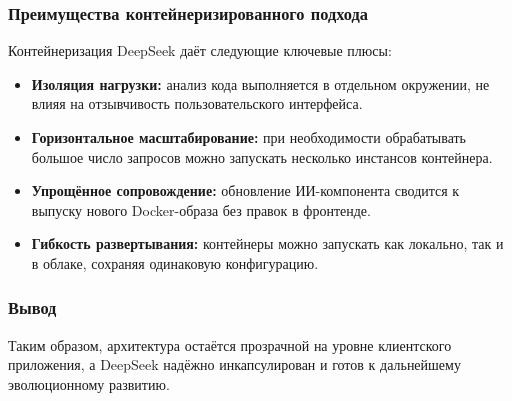 \subsubsection{Преимущества контейнеризированного подхода}
Контейнеризация DeepSeek даёт следующие ключевые плюсы:
\begin{itemize}
	\item \textbf{Изоляция нагрузки:} анализ кода выполняется в отдельном окружении, не влияя на отзывчивость пользовательского интерфейса.
	\item \textbf{Горизонтальное масштабирование:} при необходимости обрабатывать большое число запросов можно запускать несколько инстансов контейнера.
	\item \textbf{Упрощённое сопровождение:} обновление ИИ-компонента сводится к выпуску нового Docker-образа без правок в фронтенде.
	\item \textbf{Гибкость развертывания:} контейнеры можно запускать как локально, так и в облаке, сохраняя одинаковую конфигурацию.
\end{itemize}


\subsubsection{Вывод}
Таким образом, архитектура остаётся прозрачной на уровне клиентского приложения, а DeepSeek надёжно инкапсулирован и готов к дальнейшему эволюционному развитию.
